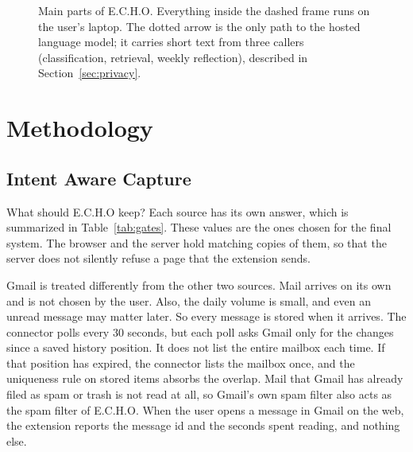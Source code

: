 \documentclass[conference]{IEEEtran}
\begin{document}
\begin{figure}[t]
\caption{Main parts of E.C.H.O. Everything inside the dashed frame runs on the user's laptop. The dotted arrow is the only path to the hosted language model; it carries short text from three callers (classification, retrieval, weekly reflection), described in Section~\ref{sec:privacy}.}
\label{fig:arch}
\end{figure}

\section{Methodology}\label{sec:method}
\subsection{Intent Aware Capture}
What should E.C.H.O keep? Each source has its own answer, which is summarized in Table~\ref{tab:gates}. These values are the ones chosen for the final system. The browser and the server hold matching copies of them, so that the server does not silently refuse a page that the extension sends.

Gmail is treated differently from the other two sources. Mail arrives on its own and is not chosen by the user. Also, the daily volume is small, and even an unread message may matter later. So every message is stored when it arrives. The connector polls every 30 seconds, but each poll asks Gmail only for the changes since a saved history position. It does not list the entire mailbox each time. If that position has expired, the connector lists the mailbox once, and the uniqueness rule on stored items absorbs the overlap. Mail that Gmail has already filed as spam or trash is not read at all, so Gmail's own spam filter also acts as the spam filter of E.C.H.O. When the user opens a message in Gmail on the web, the extension reports the message id and the seconds spent reading, and nothing else.
\end{document}
